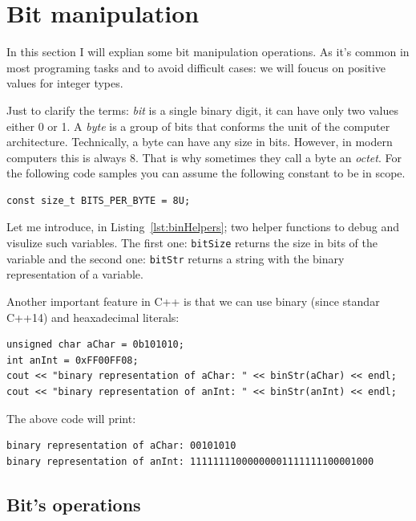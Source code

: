 \section{Bit manipulation}

In this section I will explian some bit manipulation operations.
As it's common in most programing tasks and to avoid difficult cases: we will foucus on positive values for integer types.

Just to clarify the terms: \emph{bit} is a single binary digit, it can have only two values either 0 or 1.
A \emph{byte} is a group of bits that conforms the unit of the computer architecture.
Technically, a byte can have any size in bits.
However, in modern computers this is always 8.
That is why sometimes they call a byte an \emph{octet}.
For the following code samples you can assume the following constant to be in scope.

\begin{verbatim}
const size_t BITS_PER_BYTE = 8U;
\end{verbatim}

Let me introduce, in Listing~\ref{lst:binHelpers}; two helper functions to debug and visulize such variables.
The first one: \texttt{bitSize} returns the size in bits of the variable and the second one: \texttt{bitStr} returns a string with the binary representation of a variable.


Another important feature in C++ is that we can use binary (since standar C++14) and heaxadecimal literals:
\begin{verbatim}
unsigned char aChar = 0b101010;
int anInt = 0xFF00FF08;
cout << "binary representation of aChar: " << binStr(aChar) << endl;
cout << "binary representation of anInt: " << binStr(anInt) << endl;
\end{verbatim}
The above code will print:
\begin{verbatim}
binary representation of aChar: 00101010
binary representation of anInt: 11111111000000001111111100001000
\end{verbatim} 

\subsection{Bit's operations}

